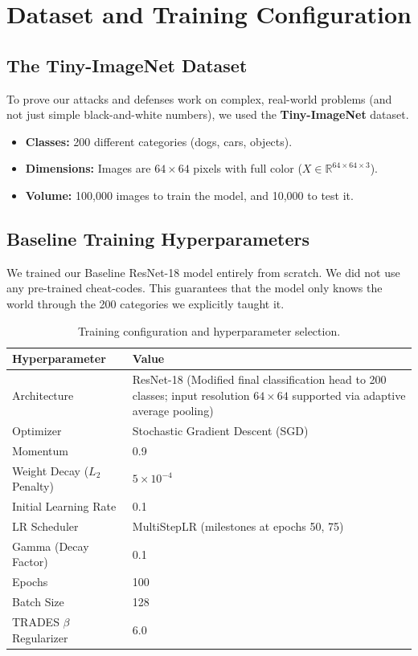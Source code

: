 \documentclass[12pt, a4paper]{article}
\begin{document}
\newpage
\section{Dataset and Training Configuration}

\subsection{The Tiny-ImageNet Dataset}
To prove our attacks and defenses work on complex, real-world problems (and not just simple black-and-white numbers), we used the \textbf{Tiny-ImageNet} dataset.
\begin{itemize}
    \item \textbf{Classes:} 200 different categories (dogs, cars, objects).
    \item \textbf{Dimensions:} Images are $64 \times 64$ pixels with full color ($X \in \mathbb{R}^{64 \times 64 \times 3}$).
    \item \textbf{Volume:} 100,000 images to train the model, and 10,000 to test it.
\end{itemize}

\subsection{Baseline Training Hyperparameters}
We trained our Baseline ResNet-18 model entirely from scratch. We did not use any pre-trained cheat-codes. This guarantees that the model only knows the world through the 200 categories we explicitly taught it.

\begin{table}[H]
    \centering
    \begin{tabular}{@{}lp{10cm}@{}}
    \toprule
    \textbf{Hyperparameter} & \textbf{Value} \\ \midrule
    Architecture & ResNet-18 (Modified final classification head to 200 classes; input resolution $64\times64$ supported via adaptive average pooling) \\
    Optimizer & Stochastic Gradient Descent (SGD) \\
    Momentum & 0.9 \\
    Weight Decay ($L_2$ Penalty) & $5 \times 10^{-4}$ \\
    Initial Learning Rate & 0.1 \\
    LR Scheduler & MultiStepLR (milestones at epochs 50, 75) \\
    Gamma (Decay Factor) & 0.1 \\
    Epochs & 100 \\
    Batch Size & 128 \\
    TRADES $\beta$ Regularizer & 6.0 \\ \bottomrule
    \end{tabular}
    \caption{Training configuration and hyperparameter selection.}
\end{table}
\end{document}

